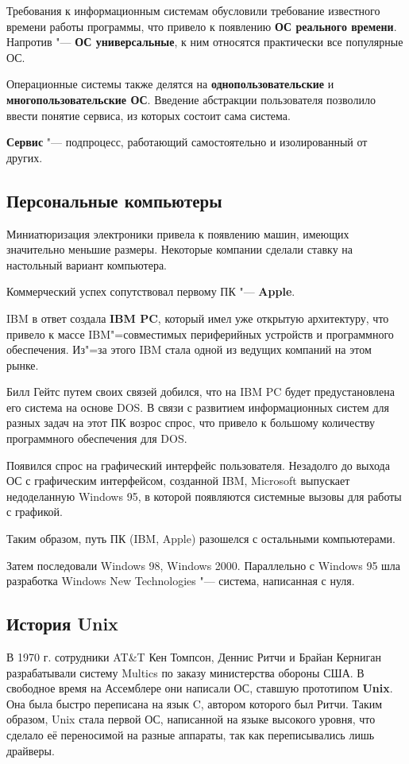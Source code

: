 Требования к информационным системам обусловили требование известного времени работы программы, что привело к появлению \textbf{ОС реального времени}. Напротив "--- \textbf{ОС универсальные}, к ним относятся практически все популярные ОС.

Операционные системы также делятся на \textbf{однопользовательские} и \textbf{многопользовательские ОС}. Введение абстракции пользователя позволило ввести понятие сервиса, из которых состоит сама система.

\textbf{Сервис} "--- подпроцесс, работающий самостоятельно и изолированный от других.

\subsection{Персональные компьютеры}

Миниатюризация электроники привела к появлению машин, имеющих значительно меньшие размеры. Некоторые компании сделали ставку на настольный вариант компьютера.

Коммерческий успех сопутствовал первому ПК "--- \textbf{Apple}.

IBM в ответ создала \textbf{IBM PC}, который имел уже открытую архитектуру, что привело к массе  IBM"=совместимых периферийных устройств и программного обеспечения. Из"=за этого IBM стала одной из ведущих компаний на этом рынке.

Билл Гейтс путем своих связей добился, что на IBM PC будет предустановлена его система на основе DOS. В связи с развитием информационных систем для разных задач на этот ПК возрос спрос, что привело к большому количеству программного обеспечения для DOS.

Появился спрос на графический интерфейс пользователя. Незадолго до выхода ОС с графическим интерфейсом, созданной IBM, Microsoft выпускает недоделанную Windows 95, в которой появляются системные вызовы для работы с графикой.

Таким образом, путь ПК (IBM, Apple) разошелся с остальными компьютерами.

Затем последовали Windows 98, Windows 2000. Параллельно с Windows 95 шла разработка Windows New Technologies "--- система, написанная с нуля.

\subsection{История Unix}

В 1970 г. сотрудники AT\&T Кен Томпсон, Деннис Ритчи и Брайан Керниган разрабатывали систему Multics по заказу министерства обороны США. В свободное время на Ассемблере они написали ОС, ставшую прототипом \textbf{Unix}. Она была быстро переписана на язык C, автором которого был Ритчи. Таким образом, Unix стала первой ОС, написанной на языке высокого уровня, что сделало её переносимой на разные аппараты, так как переписывались лишь драйверы.

